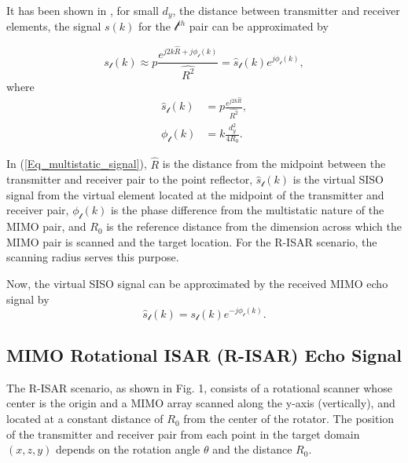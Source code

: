 \documentclass[conference]{IEEEtran}
\begin{document}
		It has been shown in \cite{Yanik:NearFieldMIMOSAR,Yanik:CascadedMIMO}, for small $d_y$, the distance between transmitter and receiver elements, the signal $s(k)$ for the $\mathcal{l}^{th}$ pair can be approximated by
		
		\begin{equation}
		s_\mathcal{l}(k) \approx p \frac{e^{j2k\hat{R} + j\phi_\mathcal{l}(k)}}{\hat{R^2}} = \hat{s}_\mathcal{l}(k) e^{j\phi_\mathcal{l}(k)},
		\end{equation}
		where
		\begin{align}
		\hat{s}_\mathcal{l}(k)& = p \frac{e^{j2k\hat{R}}}{\hat{R^2}}, \\
		\phi_\mathcal{l}(k) &= k\frac{d_y^2}{4R_0}.
		\label{Eq_multistatic_signal}
		\end{align}
		
		In (\ref{Eq_multistatic_signal}), $\hat{R}$ is the distance from the midpoint between the transmitter and receiver pair to the point reflector, $\hat{s}_\mathcal{l}(k)$ is the virtual SISO signal from the virtual element located at the midpoint of the transmitter and receiver pair, $\phi_\mathcal{l}(k)$ is the phase difference from the multistatic nature of the MIMO pair, and $R_0$ is the reference distance from the dimension across which the MIMO pair is scanned and the target location. For the R-ISAR scenario, the scanning radius serves this purpose.
		
		Now, the virtual SISO signal can be approximated by the received MIMO echo signal by
		\begin{equation}
		\hat{s}_\mathcal{l}(k) = s_\mathcal{l}(k)e^{-j\phi_\mathcal{l}(k)}.
		\end{equation}
		
		
		\subsection{MIMO Rotational ISAR (R-ISAR) Echo Signal}
		\label{Sec_mimo_r-isar_signal}
		
		The R-ISAR scenario, as shown in Fig. 1, consists of a rotational scanner whose center is the origin and a MIMO array scanned along the y-axis (vertically), and located at a constant distance of $R_0$ from the center of the rotator. The position of the transmitter and receiver pair from each point in the target domain $(x,z,y)$ depends on the rotation angle $\theta$ and the distance $R_0$.
		
\end{document}
